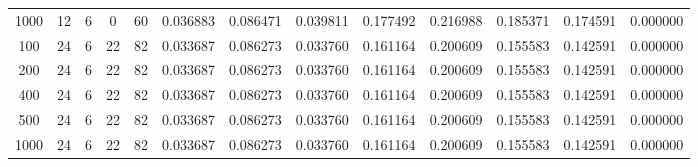 \begin{table}[h]
\begin{tabular}{ccccccccccccc}
1000 & 12 & 6 & 0 & 60 & 0.036883 & 0.086471 & 0.039811 & 0.177492 & 0.216988 & 0.185371 & 0.174591 & 0.000000 \\
100 & 24 & 6 & 22 & 82 & 0.033687 & 0.086273 & 0.033760 & 0.161164 & 0.200609 & 0.155583 & 0.142591 & 0.000000 \\
200 & 24 & 6 & 22 & 82 & 0.033687 & 0.086273 & 0.033760 & 0.161164 & 0.200609 & 0.155583 & 0.142591 & 0.000000 \\
400 & 24 & 6 & 22 & 82 & 0.033687 & 0.086273 & 0.033760 & 0.161164 & 0.200609 & 0.155583 & 0.142591 & 0.000000 \\
500 & 24 & 6 & 22 & 82 & 0.033687 & 0.086273 & 0.033760 & 0.161164 & 0.200609 & 0.155583 & 0.142591 & 0.000000 \\
1000 & 24 & 6 & 22 & 82 & 0.033687 & 0.086273 & 0.033760 & 0.161164 & 0.200609 & 0.155583 & 0.142591 & 0.000000 \\
\bottomrule
\end{tabular}
\end{table}
